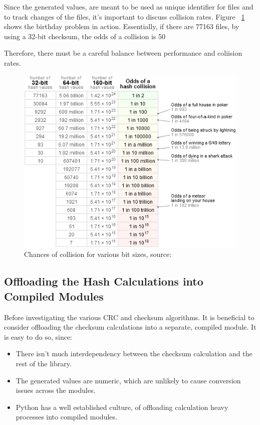 Since the generated values, are meant to be used as unique identifier for files and to track changes of the files, it's important
to discuss collision rates. Figure ~\ref{fig:checksum_fig_1} shows the birthday problem in action.
Essentially, if there are 77163 files, by using a 32-bit checksum, the odds of a collision is 50%

Therefore, there must be a careful balance between performance and coliision rates.

\begin{figure}[h]
    \centering
    \includegraphics[width=12cm]{figures/checksum/collisions}
    \caption{Chances of collision for various bit sizes, source: ~\cite{PreshingCollisions}}
    \label{fig:checksum_fig_1}
\end{figure}



\subsection{Offloading the Hash Calculations into Compiled Modules}
Before investigating the various CRC and checksum algorithms.
It is beneficial to consider offloading the checksum calculations into a separate, compiled module.
It is easy to do so, since:

\begin{itemize}
    \item There isn't much interdependency between the checksum calculation and the rest of the library.
    \item The generated values are numeric, which are unlikely to cause conversion issues across the modules.
    \item Python has a well established culture, of offloading calculation heavy processes into compiled modules.
\end{itemize}

